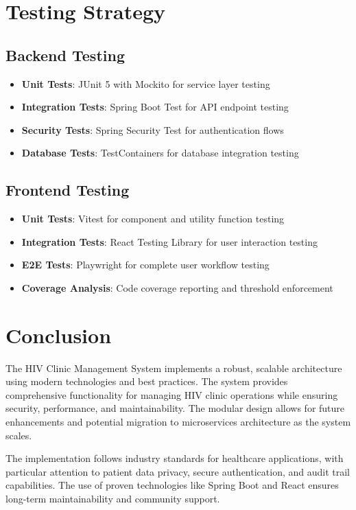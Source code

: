 \documentclass[12pt,a4paper]{article}
\begin{document}
\section{Testing Strategy}

\subsection{Backend Testing}
\begin{itemize}
    \item \textbf{Unit Tests}: JUnit 5 with Mockito for service layer testing
    \item \textbf{Integration Tests}: Spring Boot Test for API endpoint testing
    \item \textbf{Security Tests}: Spring Security Test for authentication flows
    \item \textbf{Database Tests}: TestContainers for database integration testing
\end{itemize}

\subsection{Frontend Testing}
\begin{itemize}
    \item \textbf{Unit Tests}: Vitest for component and utility function testing
    \item \textbf{Integration Tests}: React Testing Library for user interaction testing
    \item \textbf{E2E Tests}: Playwright for complete user workflow testing
    \item \textbf{Coverage Analysis}: Code coverage reporting and threshold enforcement
\end{itemize}

\section{Conclusion}

The HIV Clinic Management System implements a robust, scalable architecture using modern technologies and best practices. The system provides comprehensive functionality for managing HIV clinic operations while ensuring security, performance, and maintainability. The modular design allows for future enhancements and potential migration to microservices architecture as the system scales.

The implementation follows industry standards for healthcare applications, with particular attention to patient data privacy, secure authentication, and audit trail capabilities. The use of proven technologies like Spring Boot and React ensures long-term maintainability and community support.
\end{document}
